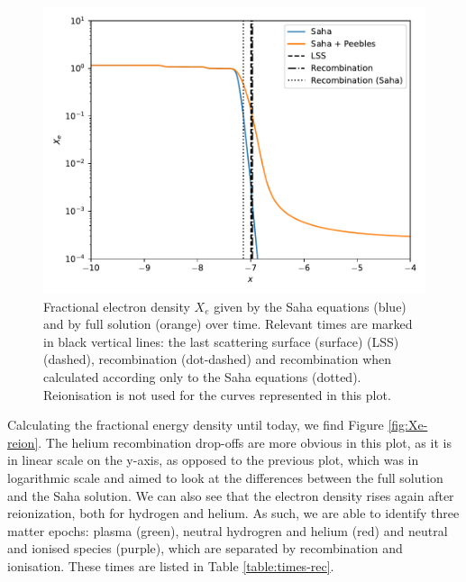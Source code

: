 \documentclass{aa}
\begin{document}
\begin{figure}[ht]
    \centering
    \includegraphics[width=\hsize]{report/figures/Xe.pdf}
    \caption{Fractional electron density $X_e$ given by the Saha equations (blue) and by full solution (orange) over time. Relevant times are marked in black vertical lines: the last scattering surface (surface) (LSS) (dashed),  recombination (dot-dashed) and recombination when calculated according only to the Saha equations (dotted). Reionisation is not used for the curves represented in this plot.}
    \label{fig:Xe-Saha}
\end{figure}

Calculating the fractional energy density until today, we find Figure \ref{fig:Xe-reion}. The helium recombination drop-offs are more obvious in this plot, as it is in linear scale on the y-axis, as opposed to the previous plot, which was in logarithmic scale and aimed to look at the differences between the full solution and the Saha solution. We can also see that the electron density rises again after reionization, both for hydrogen and helium. As such, we are able to identify three matter epochs: plasma (green), neutral hydrogren and helium (red) and neutral and ionised species (purple), which are separated by recombination and ionisation. These times are listed in Table \ref{table:times-rec}.
\end{document}
